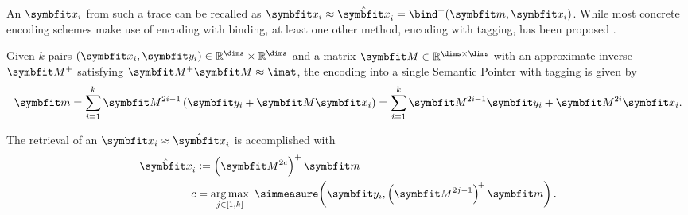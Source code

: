 An $\vc x_i$ from such a trace can be recalled as $\vc x_i \approx \hat{\vc x}_i = \bind^+(\vc m, \vc x_i)$.
While most concrete encoding schemes make use of encoding with binding, at least one other method, encoding with tagging, has been proposed \parencite{recchia2015}.
\begin{defn}
    Given $k$ pairs $(\vc x_i, \vc y_i) \in \mathbb{R}^{\dims} \times \mathbb{R}^{\dims}$ and a matrix $\mat M \in \mathbb{R}^{\dims \times \dims}$ with an approximate inverse $\mat M^+$ satisfying $\mat M^+ \mat M \approx \imat$, the encoding into a single Semantic Pointer with tagging is given by
    \begin{equation}
        \vc m = \sum_{i=1}^k \mat M^{2i-1} \del{\vc y_i + \mat M \vc x_i} = \sum_{i=1}^k \mat M^{2i-1} \vc y_i + \mat M^{2i} \vc x_i \text{.}
    \end{equation}
\end{defn}
The retrieval of an $\vc x_i \approx \hat{\vc x}_i$ is accomplished with
\begin{align}
    \hat{\vc x}_i &:= \del{\mat M^{2c}}^+ \vc m \\
    c &= \argmax_{j \in \sbr{1, k}}\ \simmeasure\!\del{\vc y_i, \del{\mat M^{2j-1}}^{\!+} \vc m} \text{.}
\end{align}

